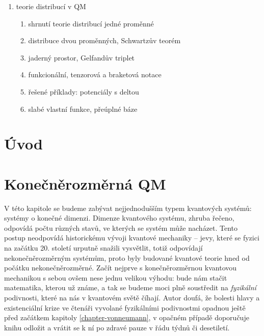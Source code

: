 \documentclass[10pt,a4paper]{report}
\theoremstyle{definition}
\begin{document}
\begin{enumerate}
    \item teorie distribucí v QM
    \begin{enumerate}
        \item shrnutí teorie distribucí jedné proměnné
        \item distribuce dvou proměnných, Schwartzův teorém
        \item jaderný prostor, Gelfandův triplet
        \item funkcionální, tenzorová a braketová notace
        \item řešené příklady: potenciály s deltou
        \item slabé vlastní funkce, přeúplné báze
    \end{enumerate}
\end{enumerate}

\pagebreak

\chapter{Úvod}

\pagebreak

\chapter{Konečněrozměrná QM}\label{chapter-konecnerozmerna-qm}
V této kapitole se budeme zabývat nejjednodušším typem kvantových systémů: systémy o konečné dimenzi. Dimenze kvantového systému, zhruba řečeno, odpovídá počtu různých stavů, ve kterých se systém může nacházet. Tento postup neodpovídá historickému vývoji kvantové mechaniky – jevy, které se fyzici na začátku 20. století urputně snažili vysvětlit, totiž odpovídají nekonečněrozměrným systémům, proto byly budované kvantové teorie hned od počátku nekonečněrozměrné. Začít nejprve s konečněrozměrnou kvantovou mechanikou s sebou ovšem nese jednu velikou výhodu: bude nám stačit matematika, kterou už známe, a tak se budeme moci plně soustředit na \textit{fyzikální} podivnosti, které na nás v kvantovém světě číhají. Autor doufá, že bolesti hlavy a existenciální krize ve čtenáři vyvolané fyzikálními podivnostmi opadnou ještě před začátkem kapitoly \ref{chapter-vonneumann}, v opačném případě doporučuje knihu odložit a vrátit se k ní po zdravé pauze v řádu týdnů či desetiletí.
\end{document}
